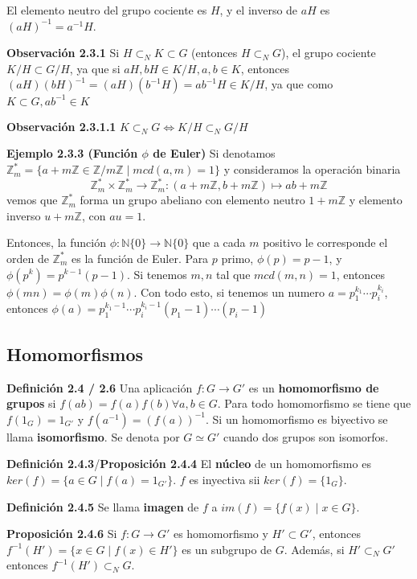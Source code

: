 \documentclass[a4paper, 11pt]{extarticle}
\newcommand{\propo}[1]{\textcolor{rojo}{\textbf{Proposición #1}}}
\newcommand{\defi}[1]{\textcolor{azul}{\textbf{Definición #1}}}
\newcommand{\obs}[1]{\textcolor{verde}{\textbf{Observación #1}}}
\newcommand{\ejem}[1]{\textcolor{verde}{\textbf{Ejemplo #1}}}
\begin{document}
El elemento neutro del grupo cociente es \(H\), y el inverso de \(aH\) es \((aH)^{-1} = a^{-1}H\).

\obs{2.3.1} Si \(H \subset_N K \subset G\) (entonces \(H \subset_N G\)), el
grupo cociente \(K/H \subset G/H\),  ya que si \(aH,bH \in K/H, a,b \in K\), entonces \((aH)(bH)^{-1} =
(aH)(b^{-1}H) = ab^{-1}H \in K/H\), ya que como \(K \subset G
, ab^{-1} \in K\)

\obs{2.3.1.1} \(K \subset_N G \iff K/H \subset_N G/H\)

\ejem{2.3.3 (Función \( \phi \) de Euler)} Si denotamos \(\mathbb{Z}^*_m = \{
a+m \mathbb{Z} \in \mathbb{Z} / m \mathbb{Z}
\;|\; mcd(a,m) = 1 \}\) y consideramos la operación binaria
\[ \mathbb{Z}^*_m \times \mathbb{Z}^*_m \rightarrow \mathbb{Z}^*_m: (a+m \mathbb{Z},
b+ m \mathbb{Z}) \mapsto ab + m \mathbb{Z}
\]
vemos que \(\mathbb{Z}^*_m\) forma un grupo abeliano con elemento neutro \(1 +
m \mathbb{Z}\) y elemento inverso \(u + m \mathbb{Z}\), con \(au = 1\).

Entonces, la función \(\phi: \mathbb{N}\{ 0 \} \rightarrow  \mathbb{N}\{ 0 \}\) que a cada \(m\) positivo le corresponde el orden de \(\mathbb{Z}^*_m\) es
la función de Euler. Para \(p\) primo, \(\phi(p) = p-1\), y \(\phi(p^k) = p^{k-1}(p-1)\). Si
tenemos \(m,n\) tal que \(mcd(m,n)=1\), entonces \(\phi(mn) =
\phi(m)\phi(n)\). Con todo esto, si tenemos un numero \(a = p_1^{k_1} \cdots
p_i^{k_i}\), entonces \(\phi(a) = p_1^{k_1-1} \cdots p_i^{k_i-1} (p_1-1) \cdots(p_i-1)\)

\subsection{Homomorfismos}
\label{sec:org813fdca}
   \defi{2.4 / 2.6} Una aplicación \(f:G \rightarrow G'\) es un \textbf{homomorfismo de grupos} si \(f(ab) = f(a)f(b) \forall a,b \in G\).
Para todo homomorfismo se tiene que \(f(1_G) = 1_{G'}\) y \(f(a^{-1}) =
(f(a))^{-1}\). Si un homomorfismo es biyectivo se llama \textbf{isomorfismo}. 
Se denota por \(G \simeq G'\) cuando dos grupos son isomorfos.

\defi{2.4.3}/\propo{2.4.4} El \textbf{núcleo} de un homomorfismo es \(ker(f) = \{ a \in G \;|\; f(a) =
1_{G'} \}\). \(f\) es inyectiva sii \(ker(f) = \{ 1_G \}\).

\defi{2.4.5} Se llama \textbf{imagen} de \(f\) a \(im(f) = \{ f(x) \;|\; x \in G \}\).

\propo{2.4.6} Si \(f: G \rightarrow G'\) es homomorfismo y \(H' \subset G'\), entonces \(f^{-1}(H') = \{ x \in G \;|\; f(x) \in H' \}\) es un subgrupo
de \(G\). Además, si \(H' \subset_N G'\) entonces \(f^{-1}(H') \subset_N G\).
\end{document}
